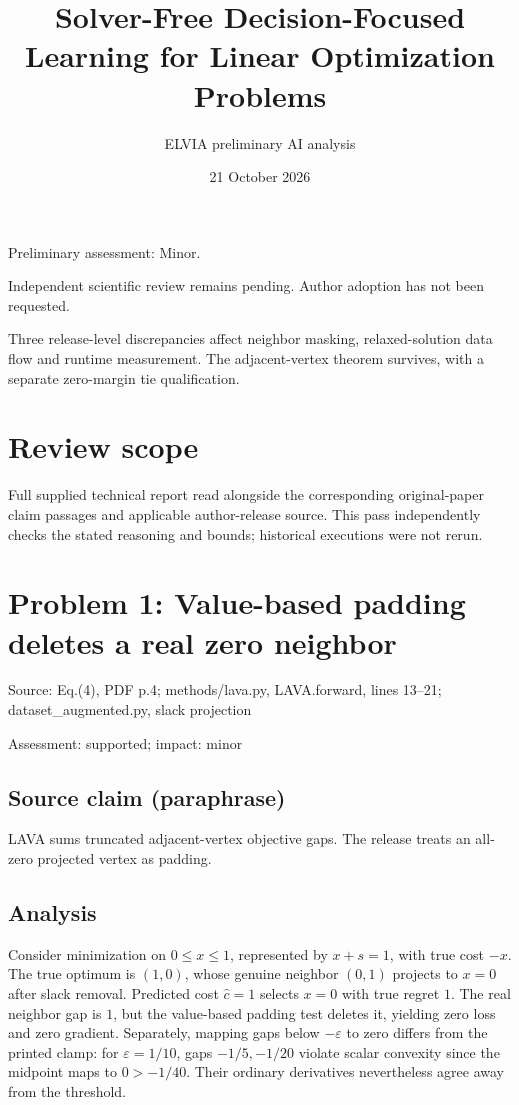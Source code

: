 \documentclass[11pt]{article}
\begin{document}
\title{Solver-Free Decision-Focused Learning for Linear Optimization Problems}

\author{ELVIA preliminary AI analysis}\date{21 October 2026}\maketitle

Preliminary assessment: Minor.\par

Independent scientific review remains pending. Author adoption has not been requested.

Three release-level discrepancies affect neighbor masking, relaxed-solution data flow and runtime measurement. The adjacent-vertex theorem survives, with a separate zero-margin tie qualification.

\section*{Review scope}

Full supplied technical report read alongside the corresponding original-paper claim passages and applicable author-release source. This pass independently checks the stated reasoning and bounds; historical executions were not rerun.

\section*{Problem 1: Value-based padding deletes a real zero neighbor}

Source: Eq.(4), PDF p.4; methods/lava.py, LAVA.forward, lines 13–21; dataset\_augmented.py, slack projection

Assessment: supported; impact: minor

\subsection*{Source claim (paraphrase)}

LAVA sums truncated adjacent-vertex objective gaps. The release treats an all-zero projected vertex as padding.

\subsection*{Analysis}

Consider minimization on \(0\leq x\leq1\), represented by \(x+s=1\), with true cost \(-x\). The true optimum is \((1,0)\), whose genuine neighbor \((0,1)\) projects to \(x=0\) after slack removal. Predicted cost \(\hat c=1\) selects \(x=0\) with true regret \(1\). The real neighbor gap is \(1\), but the value-based padding test deletes it, yielding zero loss and zero gradient. Separately, mapping gaps below \(-\varepsilon\) to zero differs from the printed clamp: for \(\varepsilon=1/10\), gaps \(-1/5,-1/20\) violate scalar convexity since the midpoint maps to \(0>-1/40\). Their ordinary derivatives nevertheless agree away from the threshold.
\end{document}
